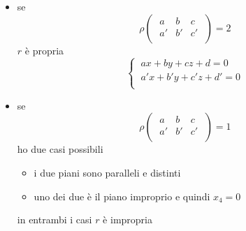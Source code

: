 \documentclass{report}
\begin{document}
\begin{itemize}
    \item se \[
    \rho
\left( \; \begin{matrix}
    a & b & c \\
    a' & b' & c' \\
\end{matrix} \; \right) = 2     
    \] \(r\) è propria \[
\begin{cases}
    \ ax + by + cz + d = 0 \\
    \ a'x + b'y + c'z + d' = 0 \\
\end{cases}
    \]
\item se \[
    \rho
\left( \; \begin{matrix}
    a & b & c \\
    a' & b' & c' \\
\end{matrix} \; \right) = 1     
    \] ho due casi possibili
    \begin{itemize}
        \item i due piani sono paralleli e distinti
        \item uno dei due è il piano improprio e quindi \(x_4 = 0\)
    \end{itemize}
    in entrambi i casi \(r\) è impropria
\end{itemize} 
\end{document}
